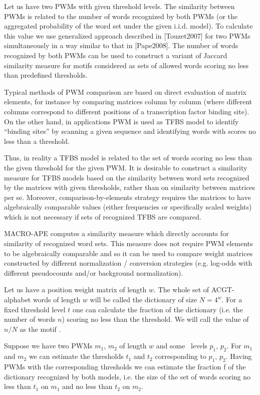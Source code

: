 Let us have two PWMs with given threshold levels. The similarity between PWMs is
related to the number of words recognized by both PWMs
(or the aggregated probability of the word set under the given i.i.d. model).
To calculate this value we use generalized approach
described in [Touzet2007] for two PWMs simultaneously in a way similar to that in [Pape2008].
The number of words recognized by both PWMs can be used to construct a variant of Jaccard
similarity measure for motifs considered as sets of allowed words scoring no less than predefined thresholds.

Typical methods of PWM comparison are based on direct evaluation of matrix elements, for instance
by comparing matrices column by column (where different columns correspond to different 
positions of a transcription factor binding site).
On the other hand, in applications PWM is used as TFBS model
to identify “binding sites” by scanning a given sequence and identifying words with scores
no less than a threshold.

Thus, in reality a TFBS model is related to the set of words
scoring no less than the given threshold for the given PWM. It is desirable to construct a 
similarity measure for TFBS models based on the similarity between word sets recognized
by the matrices with given thresholds, rather than on  similarity between matrices per
se. Moreover, comparison-by-elements strategy requires the matrices to have algebraically 
comparable values (either frequencies or specifically scaled weights) which is not necessary if 
sets of recognized TFBS are compared.

MACRO-APE computes a similarity measure which directly accounts for similarity of
recognized word sets. This measure does not require PWM elements to be algebraically 
comparable and so it can be used to compare weight matrices constructed by different 
normalization / conversion strategies (e.g. log-odds with different pseudocounts and/or background normalization).

Let us have a position weight matrix of length $w$. The whole set of ACGT-alphabet 
words of length $w$ will be called the dictionary of size $N=4^w$. For a fixed threshold level $t$ one 
can calculate the fraction of the dictionary (i.e. the number of words $n$) scoring no less than the 
threshold. We will call the value of $n / N$ as the motif \pvalue.

Suppose we have two PWMs $m_1$, $m_2$ of length $w$ and some \pvalue\ levels $p_1$, $p_2$. For $m_1$
and $m_2$ we can estimate the thresholds $t_1$ and $t_2$ corresponding to $p_1$, $p_2$. Having PWMs with the 
corresponding thresholds we can estimate the fraction f of the dictionary recognized by both 
models, i.e. the size of the set of words scoring no less than $t_1$ on $m_1$ and no less than $t_2$ on $m_2$.

